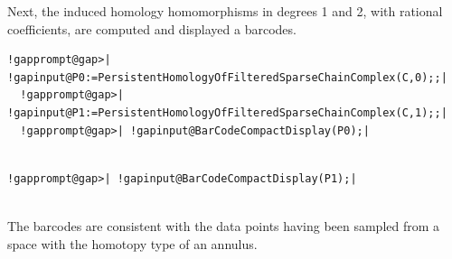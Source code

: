 \documentclass[a4paper,11pt]{report}
\begin{document}
{{\begin{Verbatim}[commandchars=!@|,fontsize=\small,frame=single,label=Example]
\end{Verbatim}
 Next, the induced homology homomorphisms in degrees 1 and 2, with rational
coefficients, are computed and displayed a barcodes. 
\begin{Verbatim}[commandchars=!@|,fontsize=\small,frame=single,label=Example]
  !gapprompt@gap>| !gapinput@P0:=PersistentHomologyOfFilteredSparseChainComplex(C,0);;|
  !gapprompt@gap>| !gapinput@P1:=PersistentHomologyOfFilteredSparseChainComplex(C,1);;|
  !gapprompt@gap>| !gapinput@BarCodeCompactDisplay(P0);|
  
\end{Verbatim}
 

 

 
\begin{Verbatim}[commandchars=!@|,fontsize=\small,frame=single,label=Example]
  !gapprompt@gap>| !gapinput@BarCodeCompactDisplay(P1);|
  
\end{Verbatim}
 

 

 The barcodes are consistent with the data points having been sampled from a
space with the homotopy type of an annulus. }

 }

 
\end{document}
